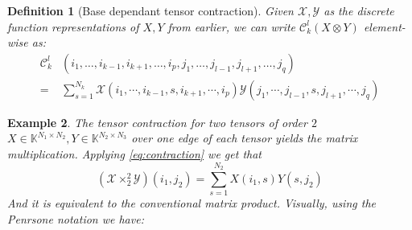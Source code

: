 \documentclass[11pt,a4paper,openright,oneside]{book}
\numberwithin{equation}{section}
\newtheorem{defn0}{Definition}[chapter]
\newtheorem{example0}[defn0]{Example}
\newenvironment{definition}{ \begin{defn0}}{\end{defn0}}
\newenvironment{example}{ \begin{example0}\rm}{\end{example0}}
\newcommand{\refeq}[1]{\cref{#1}}
\begin{document}
\begin{definition}[Base dependant tensor contraction]
     Given $\mathcal{X}, \mathcal{Y}$ as the discrete function representations
    of $X, Y$ from earlier, we can write $\mathcal{C}_k^l(X \otimes Y)$ element-wise as:
    \begin{equation}
    \begin{align}\mathcal{C}_k^l & (i_1, \dots, i_{k-1}, i_{k+1}, \dots, i_p, j_1, \dots, j_{l-1}, j_{l+1}, \dots, j_q) \\  =& \sum_{s=1}^{N_k}
        \mathcal{X}(i_1, \cdots, i_{k-1}, s, i_{k+1}, \cdots, i_p) \mathcal{Y}(j_1, \cdots, j_{l-1}, s, j_{l+1}, \cdots, j_q)
\end{align}
\label{eq:contraction}
    \end{equation}
    \end{definition}

\begin{example}
    The tensor contraction for two tensors of order $2$ $X \in \mathbb{K}^{N_1 \times N_2}, Y \in \mathbb{K}^{N_2 \times N_3}$ over one edge of each tensor yields the matrix multiplication.
    Applying \refeq{eq:contraction} we get that
    $$(\mathcal{X} \times_2^2 \mathcal{Y}) (i_1, j_2) = \sum_{s=1}^{N_2} X(i_1, s) Y(s, j_2)$$
    And it is equivalent to the conventional matrix product. Visually, using the Penrsone notation we have:
    \begin{center}
    \hfill
\begin{minipage}{0.2\textwidth}
\end{minipage}
\hfill
\begin{minipage}{0.225\textwidth}
\end{minipage}
\hfill
\begin{minipage}{0.225\textwidth}
\end{minipage}

    \end{center}
\end{example}
\end{document}
